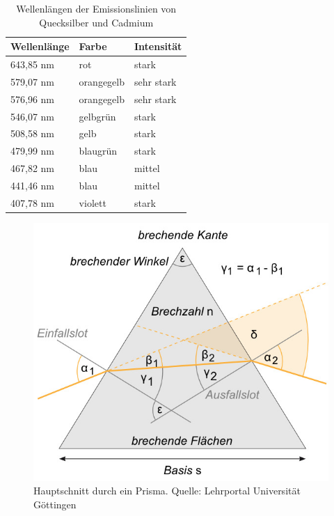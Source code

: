 \begin{table}[hb]
	\centering
		\begin{tabular}{lll}
			\hline
			Wellenlänge & Farbe & Intensität\\
			\hline
			643,85 nm & rot & stark\\
			579,07 nm & orangegelb & sehr stark\\
			576,96 nm & orangegelb & sehr stark\\
			546,07 nm & gelbgrün & stark\\
			508,58 nm & gelb & stark\\
			479,99 nm & blaugrün & stark\\
			467,82 nm & blau & mittel\\
			441,46 nm & blau & mittel\\
			407,78 nm & violett & stark\\
			\hline
		\end{tabular}
	\caption{Wellenlängen der Emissionslinien von Quecksilber und Cadmium}
	\label{tab:Wellenlaengen}
\end{table}

\begin{figure}[ht]
	\centering
		\includegraphics[width=.75\textwidth]{Versuch_9-10/Abbildungen/Hauptschnitt_lpgoe.jpg}
	\caption{Hauptschnitt durch ein Prisma. Quelle: Lehrportal Universität Göttingen}
	\label{fig:prisma2}
\end{figure}